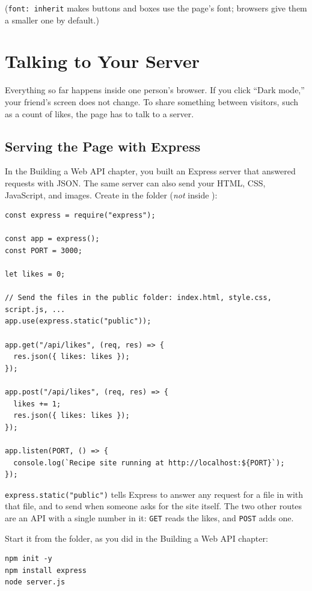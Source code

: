 (\verb|font: inherit| makes buttons and boxes use the page's font; browsers give them a smaller one by
default.)

\section{Talking to Your Server}
Everything so far happens inside one person's browser. If you click ``Dark mode,'' your friend's screen
does not change. To share something between visitors, such as a count of likes, the page has to talk to a
server.

\subsection{Serving the Page with Express}
In the Building a Web API chapter, you built an Express server that answered requests with JSON. The same server can
also send your HTML, CSS, JavaScript, and images. Create  in the 
folder (\emph{not} inside ):

\begin{verbatim}
const express = require("express");

const app = express();
const PORT = 3000;

let likes = 0;

// Send the files in the public folder: index.html, style.css, script.js, ...
app.use(express.static("public"));

app.get("/api/likes", (req, res) => {
  res.json({ likes: likes });
});

app.post("/api/likes", (req, res) => {
  likes += 1;
  res.json({ likes: likes });
});

app.listen(PORT, () => {
  console.log(`Recipe site running at http://localhost:${PORT}`);
});
\end{verbatim}

\verb|express.static("public")| tells Express to answer any request for a file in  with
that file, and to send  when someone asks for the site itself. The two other routes
are an API with a single number in it: \verb|GET| reads the likes, and \verb|POST| adds one.

Start it from the  folder, as you did in the Building a Web API chapter:

\begin{verbatim}
npm init -y
npm install express
node server.js
\end{verbatim}

